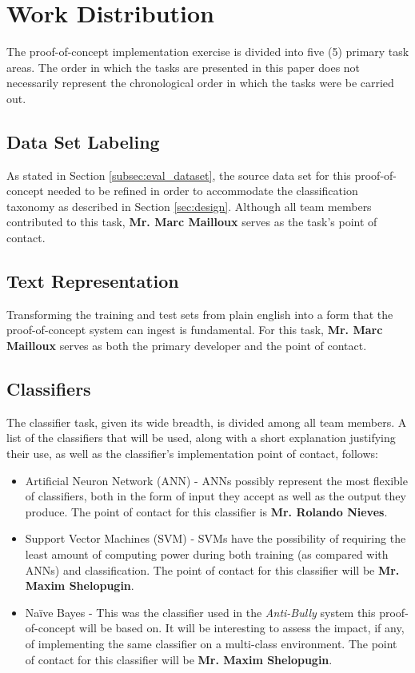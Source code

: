 \documentclass[conference]{sig-alternate-05-2015}
\begin{document}
\section{Work Distribution}\label{sec:plan_roles}
The proof-of-concept implementation exercise is divided into five (5)
primary task areas. The order in which the tasks are presented in this paper
does not necessarily represent the chronological order in which the tasks were
be carried out.

\subsection{Data Set Labeling}\label{sec:labeling_task}
As stated in Section \ref{subsec:eval_dataset}, the source data set for this
proof-of-concept needed to be refined in order to accommodate the
classification taxonomy as described in Section \ref{sec:design}. Although all
team members contributed to this task, \textbf{Mr. Marc Mailloux} serves as the
task's point of contact.

\subsection{Text Representation}\label{sec:tokenization_task}
Transforming the training and test sets from plain english into a form that the
proof-of-concept system can ingest is fundamental. For this task,
\textbf{Mr. Marc Mailloux} serves as both the primary developer and the
point of contact.

\subsection{Classifiers}\label{sec:classifier_task}
The classifier task, given its wide breadth, is divided among all team
members. A list of the classifiers that will be used, along with a short
explanation justifying their use, as well as the classifier's implementation
point of contact, follows:
\begin{itemize}
  \item Artificial Neuron Network (ANN) - ANNs possibly represent
  the most flexible of classifiers, both in the form of input they accept as
  well as the output they produce. The point of contact for this classifier is
  \textbf{Mr. Rolando Nieves}.
  \item Support Vector Machines (SVM) - SVMs have the possibility of requiring
  the least amount of computing power during both training (as compared with
  ANNs) and classification. The point of contact for this classifier will be
  \textbf{Mr. Maxim Shelopugin}.
  \item Na\"{i}ve Bayes - This was the classifier used in the \textit{Anti-Bully}
  system this proof-of-concept will be based on. It will be interesting to
  assess the impact, if any, of implementing the same classifier on a
  multi-class environment. The point of contact for this classifier will be
  \textbf{Mr. Maxim Shelopugin}.
\end{itemize}
\end{document}
